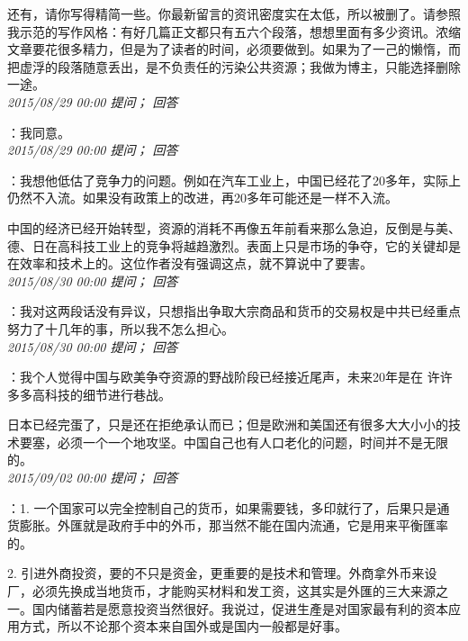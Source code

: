 \documentclass[twocolumn]{ctexart}
\begin{document}
还有，请你写得精简一些。你最新留言的资讯密度实在太低，所以被删了。请参照我示范的写作风格：有好几篇正文都只有五六个段落，想想里面有多少资讯。浓缩文章要花很多精力，但是为了读者的时间，必须要做到。如果为了一己的懒惰，而把虚浮的段落随意丢出，是不负责任的污染公共资源；我做为博主，只能选择删除一途。\\

\textit{\hfill\noindent\small 2015/08/29 00:00 提问； 回答}

：我同意。\\

\textit{\hfill\noindent\small 2015/08/29 00:00 提问； 回答}

：我想他低估了竞争力的问题。例如在汽车工业上，中国已经花了20多年，实际上仍然不入流。如果没有政策上的改进，再20多年可能还是一样不入流。

中国的经济已经开始转型，资源的消耗不再像五年前看来那么急迫，反倒是与美、德、日在高科技工业上的竞争将越趋激烈。表面上只是市场的争夺，它的关键却是在效率和技术上的。这位作者没有强调这点，就不算说中了要害。\\

\textit{\hfill\noindent\small 2015/08/30 00:00 提问； 回答}

：我对这两段话没有异议，只想指出争取大宗商品和货币的交易权是中共已经重点努力了十几年的事，所以我不怎么担心。\\

\textit{\hfill\noindent\small 2015/08/30 00:00 提问； 回答}

：我个人觉得中国与欧美争夺资源的野战阶段已经接近尾声，未来20年是在 许许多多高科技的细节进行巷战。

日本已经完蛋了，只是还在拒绝承认而已；但是欧洲和美国还有很多大大小小的技术要塞，必须一个一个地攻坚。中国自己也有人口老化的问题，时间并不是无限的。\\

\textit{\hfill\noindent\small 2015/09/02 00:00 提问； 回答}

：1. 一个国家可以完全控制自己的货币，如果需要钱，多印就行了，后果只是通货膨胀。外匯就是政府手中的外币，那当然不能在国内流通，它是用来平衡匯率的。

2. 引进外商投资，要的不只是资金，更重要的是技术和管理。外商拿外币来设厂，必须先换成当地货币，才能购买材料和发工资，这其实是外匯的三大来源之一。国内储蓄若是愿意投资当然很好。我说过，促进生產是对国家最有利的资本应用方式，所以不论那个资本来自国外或是国内一般都是好事。
\end{document}
